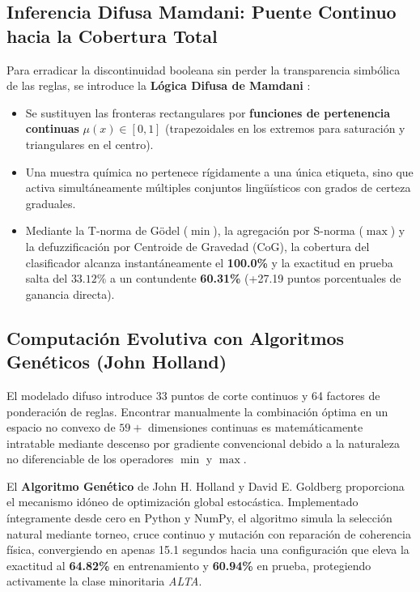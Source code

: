 \documentclass{article}
\begin{document}
\subsection{Inferencia Difusa Mamdani: Puente Continuo hacia la Cobertura Total}

Para erradicar la discontinuidad booleana sin perder la transparencia simbólica de las reglas, se introduce la \textbf{Lógica Difusa de Mamdani} \cite{zadeh1965fuzzy, mamdani1975experiment}:
\begin{itemize}
    \item Se sustituyen las fronteras rectangulares por \textbf{funciones de pertenencia continuas} $\mu(x) \in [0, 1]$ (trapezoidales en los extremos para saturación y triangulares en el centro).
    \item Una muestra química no pertenece rígidamente a una única etiqueta, sino que activa simultáneamente múltiples conjuntos lingüísticos con grados de certeza graduales.
    \item Mediante la T-norma de Gödel ($\min$), la agregación por S-norma ($\max$) y la defuzzificación por Centroide de Gravedad (CoG), la cobertura del clasificador alcanza instantáneamente el \textbf{100.0\%} y la exactitud en prueba salta del $33.12\%$ a un contundente \textbf{60.31\%} (+27.19 puntos porcentuales de ganancia directa).
\end{itemize}

\subsection{Computación Evolutiva con Algoritmos Genéticos (John Holland)}

El modelado difuso introduce 33 puntos de corte continuos y 64 factores de ponderación de reglas. Encontrar manualmente la combinación óptima en un espacio no convexo de $59+$ dimensiones continuas es matemáticamente intratable mediante descenso por gradiente convencional debido a la naturaleza no diferenciable de los operadores $\min$ y $\max$.

El \textbf{Algoritmo Genético} de John H. Holland \cite{holland1975adaptation} y David E. Goldberg \cite{goldberg1989genetic} proporciona el mecanismo idóneo de optimización global estocástica. Implementado íntegramente desde cero en Python y NumPy, el algoritmo simula la selección natural mediante torneo, cruce continuo y mutación con reparación de coherencia física, convergiendo en apenas 15.1 segundos hacia una configuración que eleva la exactitud al \textbf{64.82\%} en entrenamiento y \textbf{60.94\%} en prueba, protegiendo activamente la clase minoritaria \textit{ALTA}.
\end{document}
